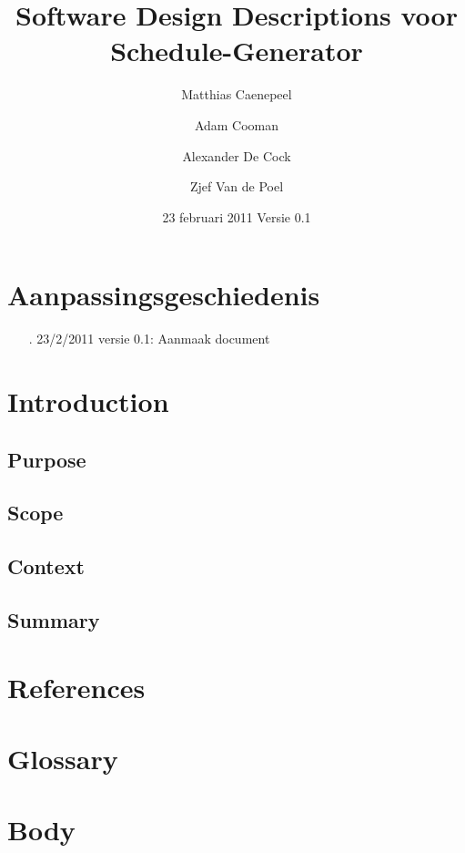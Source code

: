\documentclass{article}
\title{Software Design Descriptions voor Schedule-Generator}
\author{Matthias Caenepeel \and Adam Cooman \and Alexander De Cock \and Zjef Van de Poel}
\date{23 februari 2011 Versie 0.1}
\begin{document}
\maketitle

\newpage



\section*{Aanpassingsgeschiedenis}
\begin{itemize}
\item[.] 23/2/2011 versie 0.1: Aanmaak document \\[-3mm]
\end{itemize}


\newpage
\tableofcontents

\newpage
\section{Introduction}
\subsection{Purpose}
\subsection{Scope}
\subsection{Context}
\subsection{Summary}

\newpage
\section{References}

\newpage
\section{Glossary}

\newpage
\section{Body}
\end{document}
